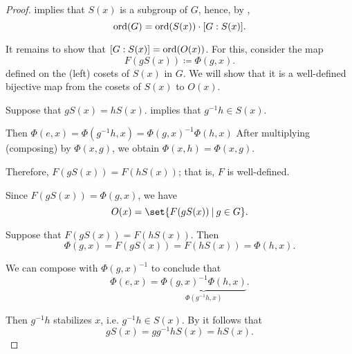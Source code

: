\begin{proof}
   implies that \( S(x) \) is a subgroup of \( G \), hence, by ,
  \begin{equation*}
    \operatorname{ord}(G) = \operatorname{ord}(S(x)) \cdot [G: S(x)].
  \end{equation*}

  It remains to show that \( [G: S(x)] = \operatorname{ord}(O(x)) \). For this, consider the map
  \begin{equation*}
    F(g S(x)) \coloneqq \Phi(g, x).
  \end{equation*}
  defined on the (left) cosets of \( S(x) \) in \( G \). We will show that it is a well-defined bijective map from the cosets of \( S(x) \) to \( O(x) \).

   Suppose that \( g S(x) = h S(x) \).  implies that \( g^{-1} h \in S(x) \).

  Then \( \Phi(e, x) = \Phi(g^{-1} h, x) = \Phi(g, x)^{-1} \Phi(h, x) \) After multiplying (composing) by \( \Phi(x, g) \), we obtain \( \Phi(x, h) = \Phi(x, g) \).

  Therefore, \( F(g S(x)) = F(h S(x)) \); that is, \( F \) is well-defined.

   Since \( F(g S(x)) = \Phi(g, x) \), we have
  \begin{equation*}
    O(x) = \set{ F(g S(x)) \given g \in G }.
  \end{equation*}

   Suppose that \( F(g S(x)) = F(h S(x)) \). Then
  \begin{equation*}
    \Phi(g, x) = F(g S(x)) = F(h S(x)) = \Phi(h, x).
  \end{equation*}

  We can compose with \( \Phi(g, x)^{-1} \) to conclude that
  \begin{equation*}
    \Phi(e, x) = \underbrace{\Phi(g, x)^{-1} \Phi(h, x)}_{\Phi(g^{-1} h, x)}.
  \end{equation*}

  Then \( g^{-1} h \) stabilizes \( x \), i.e. \( g^{-1} h \in S(x) \). By  it follows that
  \begin{equation*}
    g S(x) = g g^{-1} h S(x) = h S(x).
  \end{equation*}
\end{proof}
